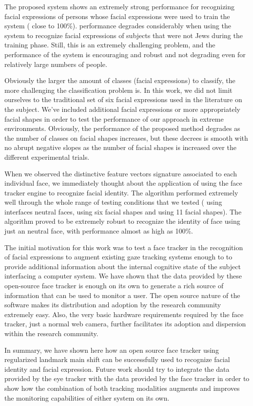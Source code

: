 \documentclass[]{article}
\begin{document}
The proposed system shows an extremely strong performance for recognizing facial expressions of persons whose facial
expressions were used to train the system ( close to 100\%). performance degrades considerably when using the system to
recognize facial expressions of subjects that were not Jews during the training phase. Still, this is an extremely
challenging problem, and the performance of the system is encouraging and robust and not degrading even for relatively
large numbers of people.


Obviously the larger the amount of classes (facial expressions) to classify, the more challenging the
classification problem is. In this work, we did not limit ourselves to the traditional set  of six facial expressions
used in the literature on the subject. We've included additional facial expressions or more appropriately facial shapes
in order to test the performance of our approach in extreme environments. Obviously, the performance of the proposed
method degrades as the number of classes  on facial shapes increases, but these decrees is smooth with no abrupt
negative slopes as the number of facial shapes is increased over the different experimental trials.


When we observed the distinctive feature vectors signature associated to each individual face, we immediately thought
about the application of using the face tracker engine to recognize facial identity. The algorithm performed extremely
well  through the whole range of testing conditions that we tested ( using interfaces neutral faces, using six facial
shapes and using 11 facial shapes). The algorithm proved to be extremely robust to recognize the identity of face using
just an neutral face, with performance  almost as high as 100\%.

The initial motivation for this work was to test a face tracker in the recognition of facial expressions  to augment
existing gaze tracking systems enough to to provide additional information about the internal cognitive state of the
subject interfacing a computer system. We have shown that the data provided by these open-source face tracker is enough
on its own to generate a rich source of information that can be used to monitor a user. The open source nature of the
software makes its distribution and adoption by the research community extremely easy. Also, the very basic hardware
requirements required by the face tracker, just a normal web camera, further facilitates its adoption and dispersion
within the research community. 


In summary, we have shown here how an open source face tracker using regularized landmark main shift can be successfully
used to recognize facial identity and facial expression. Future work should try to integrate the data provided by the
eye tracker with the data provided by the face tracker in order to show how the combination of both tracking modalities
augments and improves the monitoring capabilities of either system on its own.







\end{document}
